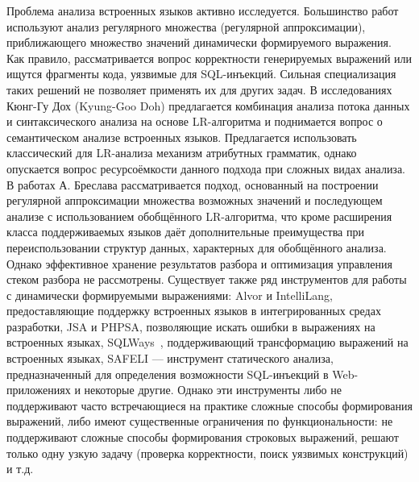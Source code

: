 

Проблема анализа встроенных языков активно исследуется. Большинство работ используют анализ регулярного множества (регулярной аппроксимации), приближающего множество значений динамически формируемого выражения. Как правило,  рассматривается вопрос корректности генерируемых выражений или ищутся фрагменты кода, уязвимые для SQL-инъекций. Сильная специализация таких решений не позволяет применять их для других задач. В исследованиях Кюнг-Гу Дох (Kyung-Goo Doh) предлагается комбинация анализа потока данных и синтаксического анализа на основе LR-алгоритма и поднимается вопрос о семантическом анализе встроенных языков. Предлагается использовать классический для LR-анализа механизм атрибутных грамматик, однако опускается вопрос ресурсоёмкости данного подхода при сложных видах анализа. В работах А. Бреслава рассматривается подход, основанный на построении регулярной аппроксимации множества возможных значений и последующем анализе с использованием обобщённого LR-алгоритма, что кроме расширения класса поддерживаемых языков даёт дополнительные преимущества при переиспользовании структур данных, характерных для обобщённого анализа. Однако эффективное хранение результатов разбора и оптимизация управления стеком разбора не рассмотрены. Существует также ряд инструментов для работы с динамически формируемыми выражениями: Alvor и IntelliLang, предоставляющие поддержку встроенных языков в интегрированных средах разработки, JSA и PHPSA, позволяющие искать ошибки в выражениях на встроенных языках, SQLWays~\cite{SQLWays}, поддерживающий трансформацию выражений на встроенных языках, SAFELI --- инструмент статического анализа, предназначенный для определения возможности SQL-инъекций в Web-приложениях и некоторые другие. Однако эти инструменты либо не поддерживают часто встречающиеся на практике сложные способы формирования выражений, либо имеют существенные ограничения по функциональности: не поддерживают сложные способы формирования строковых выражений, решают только одну узкую задачу (проверка корректности, поиск уязвимых конструкций) и т.д. 

